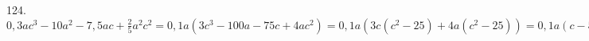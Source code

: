 124. $0,3ac^3-10a^2-7,5ac+\frac{2}{5}a^2c^2=0,1a(3c^3-100a-75c+4ac^2)=0,1a(3c(c^2-25)+4a(c^2-25))=0,1a(c-5)(c+5)(4a+3c).$\\
